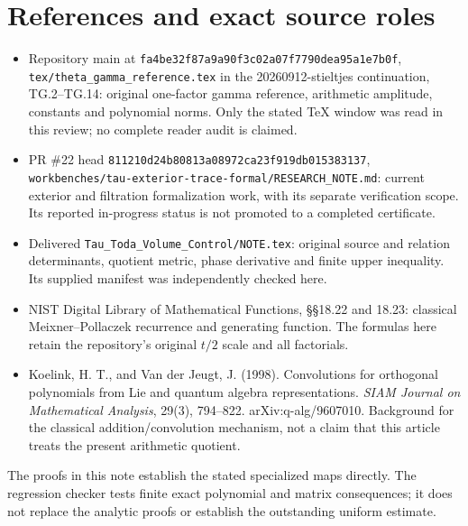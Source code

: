 \documentclass[
  11pt,
]{article}
\providecommand{\tightlist}{%
  \setlength{\itemsep}{0pt}\setlength{\parskip}{0pt}}
\begin{document}
\section{References and exact source
roles}\label{references-and-exact-source-roles}

\begin{itemize}
\tightlist
\item
  Repository main at \texttt{fa4be32f87a9a90f3c02a07f7790dea95a1e7b0f},
  \texttt{tex/theta\_gamma\_reference.tex} in the 20260912-stieltjes
  continuation, TG.2--TG.14: original one-factor gamma reference,
  arithmetic amplitude, constants and polynomial norms. Only the stated
  TeX window was read in this review; no complete reader audit is
  claimed.
\item
  PR \#22 head \texttt{811210d24b80813a08972ca23f919db015383137},
  \texttt{workbenches/tau-exterior-trace-formal/RESEARCH\_NOTE.md}:
  current exterior and filtration formalization work, with its separate
  verification scope. Its reported in-progress status is not promoted to
  a completed certificate.
\item
  Delivered \texttt{Tau\_Toda\_Volume\_Control/NOTE.tex}: original
  source and relation determinants, quotient metric, phase derivative
  and finite upper inequality. Its supplied manifest was independently
  checked here.
\item
  NIST Digital Library of Mathematical Functions, §§18.22 and 18.23:
  classical Meixner--Pollaczek recurrence and generating function. The
  formulas here retain the repository's original \(t/2\) scale and all
  factorials.
\item
  Koelink, H. T., and Van der Jeugt, J. (1998). Convolutions for
  orthogonal polynomials from Lie and quantum algebra representations.
  \emph{SIAM Journal on Mathematical Analysis}, 29(3), 794--822.
  arXiv:q-alg/9607010. Background for the classical addition/convolution
  mechanism, not a claim that this article treats the present arithmetic
  quotient.
\end{itemize}

The proofs in this note establish the stated specialized maps directly.
The regression checker tests finite exact polynomial and matrix
consequences; it does not replace the analytic proofs or establish the
outstanding uniform estimate.
\end{document}
